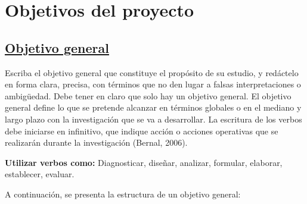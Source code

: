 \documentclass[12pt, a4paper, nofontenc, numbers=endperiod]{apa7}
\begin{document}
{	\section{\normalsize \centering Objetivos del proyecto} 
	\subsection*{\normalsize \underline{Objetivo general}} 
	\setlength{\parindent}{1.27cm}Escriba el objetivo general que constituye el propósito de su estudio, y redáctelo en forma clara, precisa, con términos que no den lugar a falsas interpretaciones o ambigüedad. Debe tener en claro que solo hay un objetivo general.  El objetivo general define lo que se pretende alcanzar en términos globales o en el mediano y largo plazo con la investigación que se va a desarrollar. La escritura de los verbos debe iniciarse en infinitivo, que indique acción o acciones operativas que se realizarán durante la investigación (Bernal, 2006).
	
	\setlength{\parindent}{1.27cm}\textbf{Utilizar verbos como:} Diagnosticar, diseñar, analizar, formular, elaborar, establecer, evaluar.
	
	\setlength{\parindent}{1.27cm}A continuación, se presenta la estructura de un objetivo general:
	
}
\end{document}
